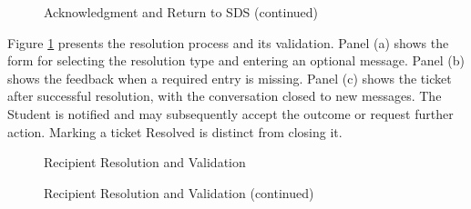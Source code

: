 \begin{figure}[htbp]
    \ContinuedFloat
    \centering
    \begin{minipage}[t]{0.43\linewidth}
        \centering
        \vspace{0pt}
        \par{}\par
    \end{minipage}
    \caption[]{Acknowledgment and Return to SDS (continued)}
\end{figure}
\FloatBarrier

Figure \ref{fig:resolve} presents the resolution process and its validation. Panel (a) shows the form for selecting the resolution type and entering an optional message. Panel (b) shows the feedback when a required entry is missing. Panel (c) shows the ticket after successful resolution, with the conversation closed to new messages. The Student is notified and may subsequently accept the outcome or request further action. Marking a ticket Resolved is distinct from closing it.

\renewcommand{\thefigure}{5.18}
\begin{figure}[htbp]
    \centering
    \begin{minipage}[t]{0.43\linewidth}
        \centering
        \vspace{0pt}
        \par{}\par
    \end{minipage}\hspace{0.04\linewidth}
    \begin{minipage}[t]{0.43\linewidth}
        \centering
        \vspace{0pt}
        \par{}\par
    \end{minipage}
    \caption{Recipient Resolution and Validation}
    \label{fig:resolve}
\end{figure}
\FloatBarrier

\begin{figure}[htbp]
    \ContinuedFloat
    \centering
    \begin{minipage}[t]{0.43\linewidth}
        \centering
        \vspace{0pt}
        \par{}\par
    \end{minipage}
    \caption[]{Recipient Resolution and Validation (continued)}
\end{figure}
\FloatBarrier

